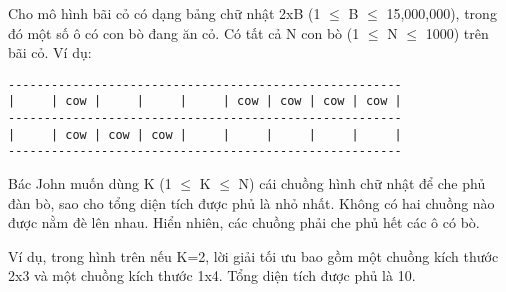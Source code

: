 Cho mô hình bãi cỏ có dạng bảng chữ nhật 2xB (1  $\le$  B  $\le$  15,000,000), trong đó một số ô có con bò đang ăn cỏ. Có tất cả N con bò (1  $\le$  N  $\le$  1000) trên bãi cỏ. Ví dụ:  
\begin{verbatim}
-------------------------------------------------------
|     | cow |     |     |     | cow | cow | cow | cow |
-------------------------------------------------------
|     | cow | cow | cow |     |     |     |     |     |
-------------------------------------------------------
\end{verbatim}

   Bác John muốn dùng K (1  $\le$  K  $\le$  N) cái chuồng hình chữ nhật để che phủ đàn bò, sao cho tổng diện tích được phủ là nhỏ nhất. Không có hai chuồng nào được nằm đè lên nhau. Hiển nhiên, các chuồng phải che phủ hết các ô có bò.  

   Ví dụ, trong hình trên nếu K=2, lời giải tối ưu bao gồm một chuồng kích thước 2x3 và một chuồng kích thước 1x4. Tổng diện tích được phủ là 10.  

\